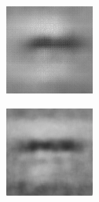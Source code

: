 \begin{figure}[H]
\begin{subfigure}[t]{0.15\textwidth}
  \end{subfigure}
  \begin{subfigure}[t]{0.15\textwidth}
    \centering
    \includegraphics[width=\linewidth]{img/one-trial/prediction_1_cnnv2.png}
  \end{subfigure}
  \begin{subfigure}[t]{0.15\textwidth}
    \centering
    \includegraphics[width=\linewidth]{img/one-trial/prediction_1_cnnv3.png}

\end{subfigure}
\end{figure}
